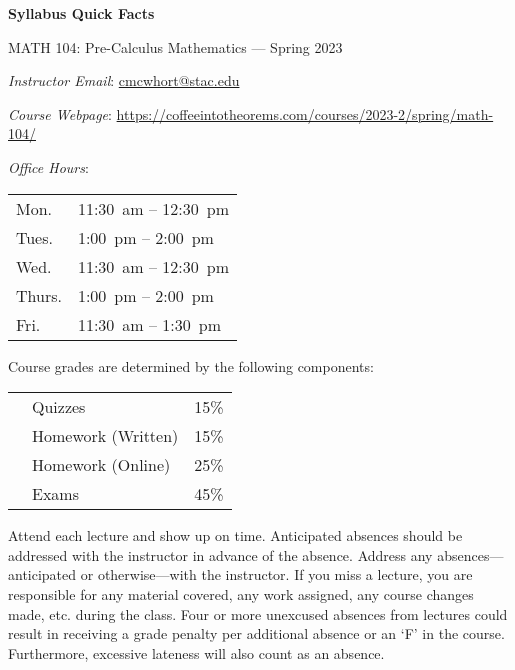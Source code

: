 \documentclass[11pt,letterpaper]{article}
\begin{document}
\begin{center} 
\bfseries
\color{stacred}
\LARGE Syllabus Quick Facts \par\vspace{0.2\baselineskip}
\Large MATH 104: Pre-Calculus Mathematics --- Spring 2023
\end{center} \pspace


\hspace{0.53cm} {\itshape Instructor Email}: \href{mailto:cmcwhort@stac.edu}{cmcwhort@stac.edu} \par
\hspace{0.53cm} {\itshape Course Webpage}: \href{https://coffeeintotheorems.com/courses/2023-2/spring/math-104/}{https://coffeeintotheorems.com/courses/2023-2/spring/math-104/} \par
\hspace{0.53cm} {\itshape Office Hours}: 	\par \vspace{-0.3cm}
	\begin{table}[!ht]
	\centering
	\begin{tabular}{l || l}
	Mon. & 11:30~am -- 12:30~pm \\
	Tues. & 1:00~pm -- 2:00~pm \\
	Wed. & 11:30~am -- 12:30~pm \\
	Thurs. & 1:00~pm -- 2:00~pm \\
	Fri. & 11:30~am -- 1:30~pm
	\end{tabular}
	\end{table} \pspace


Course grades are determined by the following components: \par \vspace{-0.3cm}
	\begin{table}[!ht]
        \begin{tabular}{clr}
	& Quizzes & 15\% \\
	& Homework (Written) & 15\% \\
	& Homework (Online) & 25\% \\
	& Exams & 45\%
        \end{tabular} 
        \end{table}


Attend each lecture and show up on time. Anticipated absences should be addressed with the instructor in advance of the absence. Address any absences---anticipated or otherwise---with the instructor. If you miss a lecture, you are responsible for any material covered, any work assigned, any course changes made, etc. during the class. Four or more unexcused absences from lectures could result in receiving a grade penalty per additional absence or an `F' in the course. Furthermore, excessive lateness will also count as an absence. \pspace
\end{document}
